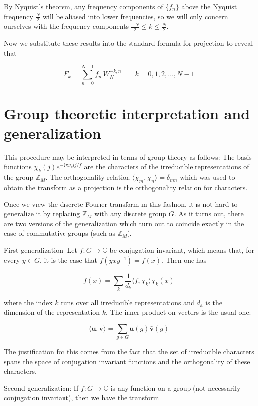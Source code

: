 \documentclass[12pt]{article}
\newcommand{\vv}[1]{\ensuremath{\mathbf{#1}}}
\begin{document}
By Nyquist's theorem, any frequency components of $\{f_n\}$ above the Nyquist frequency $\frac{N}{2}$ will be aliased into lower frequencies, so we will only concern ourselves with the frequency components $\frac{-N}{2} \leq k \leq \frac{N}{2}$.

Now we substitute these results into the standard formula for projection to reveal that

$$F_k = \sum_{n=0}^{N-1} f_n\,W_N^{-k,n}\quad \quad k=0, 1, 2, \dots, N-1$$

\section{Group theoretic interpretation and generalization}

This procedure may be interpreted in terms of group theory as follows:  The basis functions $\chi_k (j) e^{-2\pi \nu_k i j / f}$ are the characters of the irreducible representations of the group $\mathbb{Z}_M$.  The orthogonality relation $\langle \chi_m, \chi_n \rangle = \delta_{mn}$ which was used to obtain the transform as a projection is   the orthogonality relation for characters.

Once we view the discrete Fourier transform in this fashion, it is not hard to generalize it by replacing $\mathbb{Z}_M$ with any discrete group $G$.  As it turns out, there are two versions of the generalization which turn out to coincide exactly in the case of commutative groups (such as $\mathbb{Z}_M$).

First generalization:  Let $f \colon G \to \mathbb{C}$ be conjugation invariant, which means that, for every $y \in G$, it is the case that $f(yxy^{-1}) = f(x)$.  Then one has

 \[ f(x) = \sum_k \frac{1}{d_k} \langle f, \chi_k \rangle \chi_k (x) \]

where the index $k$ runs over all irreducible representations and $d_k$ is the dimension of the representation $k$.  The inner product on vectors is the usual one:

 \[ \langle \vv{u}, \vv{v} \rangle = \sum_{g \in G} \vv{u} (g) \bar{\vv{v}} (g) \]

The justification for this comes from the fact that the set of irreducible characters spans the space of conjugation invariant functions and the orthogonality of these characters.

Second generalization:  If $f \colon G \to \mathbb{C}$ is any function on a group (not necessarily conjugation invariant), then we have the transform
\end{document}
